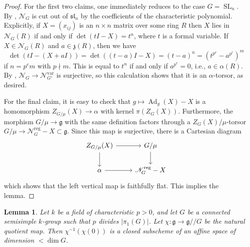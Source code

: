 \documentclass[11pt,reqno]{amsart}
\newtheorem{lemma}[theorem]{Lemma}
\theoremstyle{definition}
\renewcommand{\rm}{\mathrm}
\newcommand{\sN}{{\mathscr N}}
\newcommand{\fg}{\mathfrak{g}}
\newcommand{\fz}{\mathfrak{z}}
\DeclareMathOperator{\Ad}{Ad}
\DeclareMathOperator{\SL}{SL}
\begin{document}
\begin{proof}
For the first two claims, one immediately reduces to the case $G = \SL_n$. By \cite[Lemma 4.11(3)]{Integral-Springer}, $\sN_G$ is cut out of $\mathfrak{sl}_n$ by the coefficients of the characteristic polynomial. Explicitly, if $X = (x_{ij})$ is an $n \times n$ matrix over some ring $R$ then $X$ lies in $\sN_G(R)$ if and only if $\det(tI - X) = t^n$, where $t$ is a formal variable. If $X \in \sN_G(R)$ and $a \in \fz(R)$, then we have
\[
\det(tI - (X + aI)) = \det((t-a)I - X) = (t-a)^n = (t^{p^e} - a^{p^e})^m
\]
if $n = p^e m$ with $p \nmid m$. This is equal to $t^n$ if and only if $a^{p^e} = 0$, i.e., $a \in \alpha(R)$. By \cite[Lemma 4.11(2)]{Integral-Springer}, $\sN_G \to \sN_{G'}^{\rm{var}}$ is surjective, so this calculation shows that it is an $\alpha$-torsor, as desired.

For the final claim, it is easy to check that $g \mapsto \Ad_g(X) - X$ is a homomorphism $Z_{G/\mu}(X) \to \alpha$ with kernel $\pi(Z_G(X))$. Furthermore, the morphism $G/\mu \to \fg$ with the same definition factors through a $Z_G(X)/\mu$-torsor $G/\mu \to \sN_G^{\rm{reg}} - X \subset \fg$. Since this map is surjective, there is a Cartesian diagram
\[
\begin{tikzcd}
    Z_{G/\mu}(X) \arrow[r] \arrow[d]
        &G/\mu \arrow[d] \\
    \alpha \arrow[r]
        &\sN_G^{\rm{reg}} - X
\end{tikzcd}
\]
which shows that the left vertical map is faithfully flat. This implies the lemma.
\end{proof}

\begin{lemma}\label{lemma:nilp-var-emb-dim}
    Let $k$ be a field of characteristic $p > 0$, and let $G$ be a connected semisimple $k$-group such that $p$ divides $|\pi_1(G)|$. Let $\chi\colon \fg \to \fg/\!/G$ be the natural quotient map. Then $\chi^{-1}(\chi(0))$ is a closed subscheme of an affine space of dimension $< \dim G$.
\end{lemma}
\end{document}

